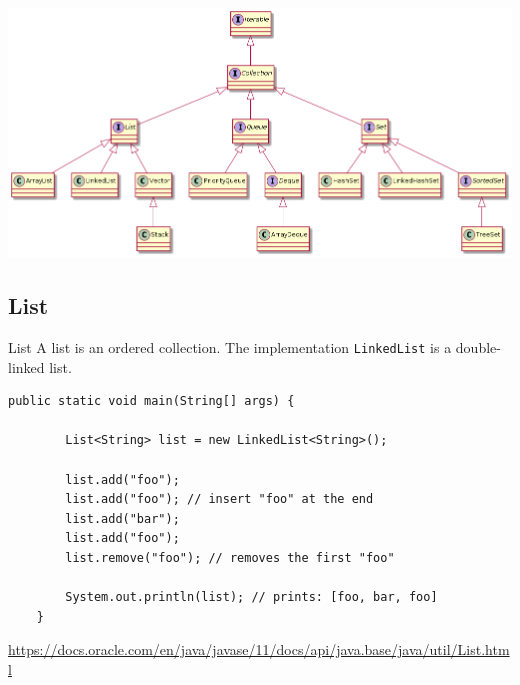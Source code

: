 \begin{frame}
	\includegraphics[width=\textwidth]{07_collection/collection.png}
\end{frame}


\subsection{List}

\begin{frame}[fragile]{List}
	A list is an ordered collection.
	\vfill
	The implementation \texttt{LinkedList} is a double-linked list.
	\begin{lstlisting}[basicstyle=\ttfamily\scriptsize]
	public static void main(String[] args) {
	
	    List<String> list = new LinkedList<String>();
	    
	    list.add("foo"); 
	    list.add("foo"); // insert "foo" at the end
	    list.add("bar");
	    list.add("foo");
	    list.remove("foo"); // removes the first "foo"
	    
	    System.out.println(list); // prints: [foo, bar, foo]
	}
	\end{lstlisting}
\url{https://docs.oracle.com/en/java/javase/11/docs/api/java.base/java/util/List.html}
\end{frame}
	
